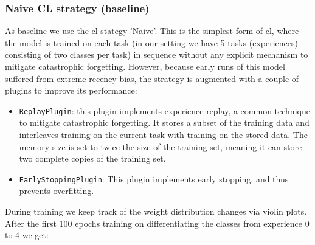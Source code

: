 \subsubsection{Naive CL strategy (baseline)}
\label{subsubsec:RQ1_naive_baseline}
As baseline we use the \acrshort{cl} stategy 'Naive'. This is the simplest form of \acrshort{cl}, where the model is trained on each task (in our setting we have 5 tasks (experiences) consisting of two classes per task) in sequence without any explicit mechanism to mitigate catastrophic forgetting. However, because early runs of this model suffered from extreme recency bias, the strategy is augmented with a couple of plugins to improve its performance: 
\begin{itemize}
    \item \verb|ReplayPlugin|: this plugin implements experience replay, a common technique to mitigate catastrophic forgetting. It stores a subset of the training data and interleaves training on the current task with training on the stored data. The memory size is set to twice the size of the training set, meaning it can store two complete copies of the training set. 
    \item \verb|EarlyStoppingPlugin|: This plugin implements early stopping, and thus prevents overfitting. 
\end{itemize}
During training we keep track of the weight distribution changes via violin plots. 
After the first 100 epochs training on differentiating the classes from experience 0 to 4 we get: 
